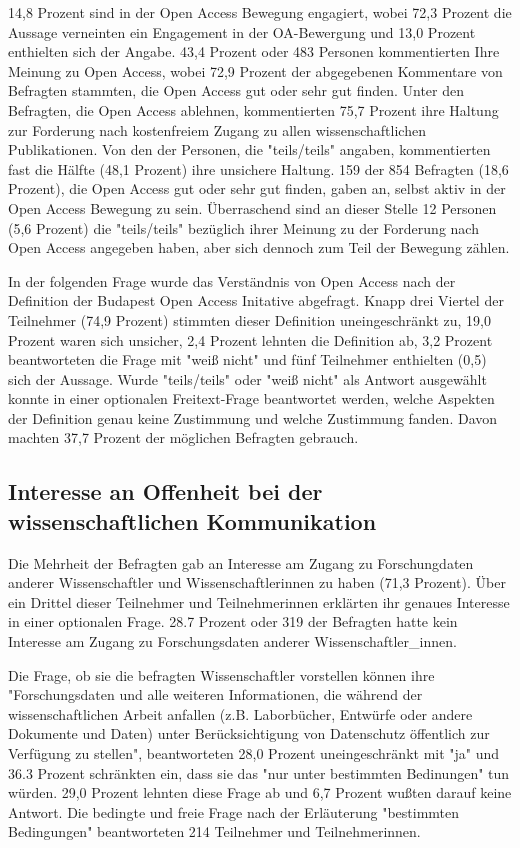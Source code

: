 14,8 Prozent sind in der Open Access Bewegung engagiert, wobei 72,3 Prozent die Aussage verneinten ein Engagement in der OA-Bewergung und 13,0 Prozent enthielten sich der Angabe. 43,4 Prozent oder 483 Personen kommentierten Ihre Meinung zu Open Access, wobei 72,9 Prozent der abgegebenen Kommentare von Befragten stammten, die Open Access gut oder sehr gut finden. Unter den Befragten, die Open Access ablehnen, kommentierten 75,7 Prozent ihre Haltung zur Forderung nach kostenfreiem Zugang zu allen wissenschaftlichen Publikationen. Von den der Personen, die "teils/teils" angaben, kommentierten fast die Hälfte (48,1 Prozent) ihre unsichere Haltung. 159 der 854 Befragten (18,6 Prozent), die Open Access gut oder sehr gut finden, gaben an, selbst aktiv in der Open Access Bewegung zu sein. Überraschend sind an dieser Stelle 12 Personen (5,6 Prozent) die "teils/teils" bezüglich ihrer Meinung zu der Forderung nach Open Access angegeben haben, aber sich dennoch zum Teil der Bewegung zählen.

In der folgenden Frage wurde das Verständnis von Open Access nach der Definition der Budapest Open Access Initative \cite{boai_2012} abgefragt. Knapp drei Viertel der Teilnehmer (74,9 Prozent) stimmten dieser Definition uneingeschränkt zu, 19,0 Prozent waren sich unsicher, 2,4 Prozent lehnten die Definition ab, 3,2 Prozent beantworteten die Frage mit "weiß nicht" und fünf Teilnehmer enthielten (0,5) sich der Aussage. Wurde "teils/teils" oder "weiß nicht" als Antwort ausgewählt konnte in einer optionalen Freitext-Frage beantwortet werden, welche Aspekten der Definition genau keine Zustimmung und welche Zustimmung fanden. Davon machten 37,7 Prozent der möglichen Befragten gebrauch.

\subsection{Interesse an Offenheit bei der wissenschaftlichen Kommunikation}

Die Mehrheit der Befragten gab an Interesse am Zugang zu Forschungdaten anderer Wissenschaftler und Wissenschaftlerinnen zu haben (71,3 Prozent). Über ein Drittel dieser Teilnehmer und Teilnehmerinnen erklärten ihr genaues Interesse in einer optionalen Frage. 28.7 Prozent oder 319 der Befragten hatte kein Interesse am Zugang zu Forschungsdaten anderer Wissenschaftler_innen.

Die Frage, ob sie die befragten Wissenschaftler vorstellen können ihre "Forschungsdaten und alle weiteren Informationen, die während der wissenschaftlichen Arbeit anfallen (z.B. Laborbücher, Entwürfe oder andere Dokumente und Daten) unter Berücksichtigung von Datenschutz öffentlich zur Verfügung zu stellen", beantworteten 28,0 Prozent uneingeschränkt mit "ja" und 36.3 Prozent schränkten ein, dass sie das "nur unter bestimmten Bedinungen" tun würden. 29,0 Prozent lehnten diese Frage ab und 6,7 Prozent wußten darauf keine Antwort. Die bedingte und freie Frage nach der Erläuterung "bestimmten Bedingungen" beantworteten 214 Teilnehmer und Teilnehmerinnen.

